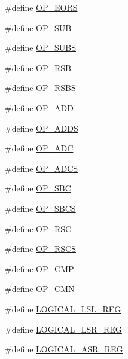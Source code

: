 \begin{DoxyCompactItemize}
\item 
\#define \mbox{\hyperlink{_g_b_a_8cpp_ae4b314376e397bf3182aa7def0d7404c}{O\+P\+\_\+\+E\+O\+RS}}
\item 
\#define \mbox{\hyperlink{_g_b_a_8cpp_abe4a72f7e3f753e7059bc2f2a01a0cfc}{O\+P\+\_\+\+S\+UB}}
\item 
\#define \mbox{\hyperlink{_g_b_a_8cpp_af7ad443f7a99539feae657dfff0db8f6}{O\+P\+\_\+\+S\+U\+BS}}
\item 
\#define \mbox{\hyperlink{_g_b_a_8cpp_adf32c701a0a978533f69ce934229356b}{O\+P\+\_\+\+R\+SB}}
\item 
\#define \mbox{\hyperlink{_g_b_a_8cpp_abe9b27e4c5be88069b41e0a7c9ccb342}{O\+P\+\_\+\+R\+S\+BS}}
\item 
\#define \mbox{\hyperlink{_g_b_a_8cpp_a073d010839a6dc707f3031db67149870}{O\+P\+\_\+\+A\+DD}}
\item 
\#define \mbox{\hyperlink{_g_b_a_8cpp_a65004b5c348ae16b8a2b8e0b9f02b9d4}{O\+P\+\_\+\+A\+D\+DS}}
\item 
\#define \mbox{\hyperlink{_g_b_a_8cpp_ac12e4e04c89f3959eaf58c68f88185e0}{O\+P\+\_\+\+A\+DC}}
\item 
\#define \mbox{\hyperlink{_g_b_a_8cpp_ab1994f2856458d70ba65c58f1f651cf7}{O\+P\+\_\+\+A\+D\+CS}}
\item 
\#define \mbox{\hyperlink{_g_b_a_8cpp_a3b83f784b191cd9fbd1dd80c8a9ec362}{O\+P\+\_\+\+S\+BC}}
\item 
\#define \mbox{\hyperlink{_g_b_a_8cpp_a08f070383f5881f32a9b8e39071b6cc3}{O\+P\+\_\+\+S\+B\+CS}}
\item 
\#define \mbox{\hyperlink{_g_b_a_8cpp_a1ded477d09f3387120843cc98f2aa147}{O\+P\+\_\+\+R\+SC}}
\item 
\#define \mbox{\hyperlink{_g_b_a_8cpp_a2c5590f712403b7ef57c57de43662185}{O\+P\+\_\+\+R\+S\+CS}}
\item 
\#define \mbox{\hyperlink{_g_b_a_8cpp_a492876cb4cd38fca3ac304654e1b74b9}{O\+P\+\_\+\+C\+MP}}
\item 
\#define \mbox{\hyperlink{_g_b_a_8cpp_ad77375d5b6804046efff797e51dea7c3}{O\+P\+\_\+\+C\+MN}}
\item 
\#define \mbox{\hyperlink{_g_b_a_8cpp_a5dfb563c49a31017ff7b8bb59c7503b6}{L\+O\+G\+I\+C\+A\+L\+\_\+\+L\+S\+L\+\_\+\+R\+EG}}
\item 
\#define \mbox{\hyperlink{_g_b_a_8cpp_acbad5309a7193fba0b6584a1b494f4cb}{L\+O\+G\+I\+C\+A\+L\+\_\+\+L\+S\+R\+\_\+\+R\+EG}}
\item 
\#define \mbox{\hyperlink{_g_b_a_8cpp_ac1a7b6056b7a092cdb5412c4829c72ae}{L\+O\+G\+I\+C\+A\+L\+\_\+\+A\+S\+R\+\_\+\+R\+EG}}

\end{DoxyCompactItemize}
